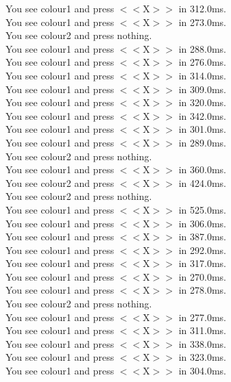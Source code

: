 \documentclass[pdflatex,sn-nature]{sn-jnl}%
\theoremstyle{thmstyleone}%
\theoremstyle{thmstyletwo}%
\theoremstyle{thmstylethree}%
\begin{document}
You see colour1 and press $<<$X$>>$ in 312.0ms. $~$\\ 
You see colour1 and press $<<$X$>>$ in 273.0ms. $~$\\ 
You see colour2 and press nothing. $~$\\ 
You see colour1 and press $<<$X$>>$ in 288.0ms. $~$\\ 
You see colour1 and press $<<$X$>>$ in 276.0ms. $~$\\ 
You see colour1 and press $<<$X$>>$ in 314.0ms. $~$\\ 
You see colour1 and press $<<$X$>>$ in 309.0ms. $~$\\ 
You see colour1 and press $<<$X$>>$ in 320.0ms. $~$\\ 
You see colour1 and press $<<$X$>>$ in 342.0ms. $~$\\ 
You see colour1 and press $<<$X$>>$ in 301.0ms. $~$\\ 
You see colour1 and press $<<$X$>>$ in 289.0ms. $~$\\ 
You see colour2 and press nothing. $~$\\ 
You see colour1 and press $<<$X$>>$ in 360.0ms. $~$\\ 
You see colour2 and press $<<$X$>>$ in 424.0ms. $~$\\ 
You see colour2 and press nothing. $~$\\ 
You see colour1 and press $<<$X$>>$ in 525.0ms. $~$\\ 
You see colour1 and press $<<$X$>>$ in 306.0ms. $~$\\ 
You see colour1 and press $<<$X$>>$ in 387.0ms. $~$\\ 
You see colour1 and press $<<$X$>>$ in 292.0ms. $~$\\ 
You see colour1 and press $<<$X$>>$ in 317.0ms. $~$\\ 
You see colour1 and press $<<$X$>>$ in 270.0ms. $~$\\ 
You see colour1 and press $<<$X$>>$ in 278.0ms. $~$\\ 
You see colour2 and press nothing. $~$\\ 
You see colour1 and press $<<$X$>>$ in 277.0ms. $~$\\ 
You see colour1 and press $<<$X$>>$ in 311.0ms. $~$\\ 
You see colour1 and press $<<$X$>>$ in 338.0ms. $~$\\ 
You see colour1 and press $<<$X$>>$ in 323.0ms. $~$\\ 
You see colour1 and press $<<$X$>>$ in 304.0ms. $~$\\ 
\end{document}
